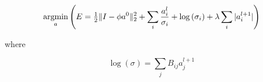 \begin{displaymath} \label{semi_supervised_energy}
    \argmin\limits_{a}
        \left( E =
            \tfrac{1}{2} \| I - \phi a^{0} \|_{2}^{2} +
        \sum\limits_{i}\frac{a_{i}^{l}}{\sigma_{i}} +
        \log \left( \sigma_{i} \right) +
        \lambda \sum\limits_{i} |a_{i}^{l+1}|
        \right)
\end{displaymath}

\noindent where

\begin{displaymath}
\log\left(\sigma\right) = \sum_{j} B_{ij}a_{j}^{l+1}
\end{displaymath}



